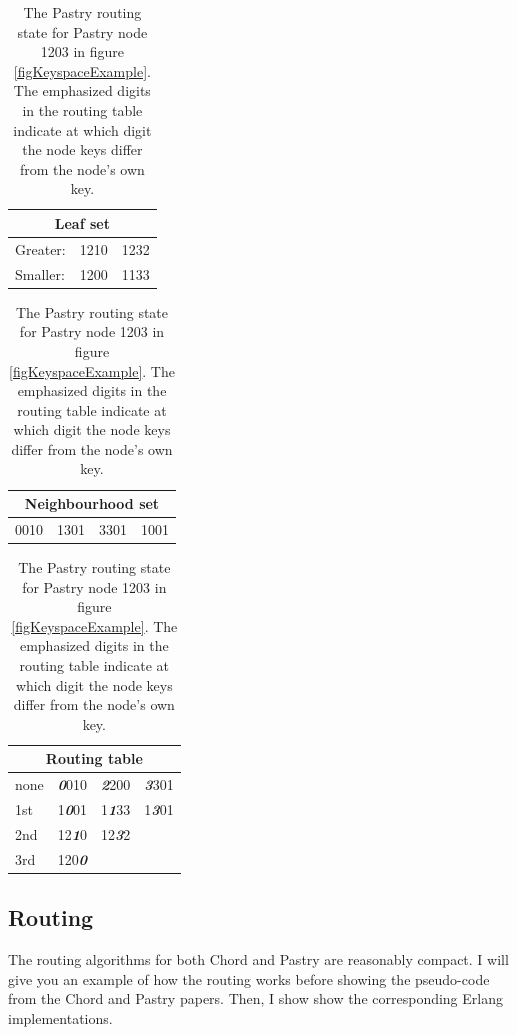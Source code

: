 \begin{table}[!htb]
\caption{The Pastry routing state for Pastry node 1203 in figure \ref{figKeyspaceExample}. The emphasized digits in the routing table indicate at which digit the node keys differ from the node's own key.}
\begin{center}
\begin{tabular}{ | l | l | l | }
  \hline
  \multicolumn{3}{|c|}{Leaf set} \\ 
  \hline
  \hline                       
  Greater: & 1210 & 1232 \\
  \hline                       
  Smaller: & 1200 & 1133 \\
  \hline                       
\end{tabular}
\begin{tabular}{ | l | l | l | l | }
  \hline                       
  \multicolumn{4}{|c|}{Neighbourhood set} \\ 
  \hline
  \hline                       
  0010 & 1301 & 3301 & 1001 \\
  \hline                       
\end{tabular}
\begin{tabular}{ | l | l | l | l | }
  \hline                       
  \multicolumn{4}{|c|}{Routing table} \\ 
  \hline
  \hline                       
  \cellcolor{green} none & \emph{\textbf{0}}010 & \emph{\textbf{2}}200 & \emph{\textbf{3}}301 \\
  \hline                       
  \cellcolor{green} 1st & 1\emph{\textbf{0}}01 & 1\emph{\textbf{1}}33 & 1\emph{\textbf{3}}01 \\
  \hline                       
  \cellcolor{green} 2nd & 12\emph{\textbf{1}}0 & 12\emph{\textbf{3}}2 & \\
  \hline                       
  \cellcolor{green} 3rd & 120\emph{\textbf{0}} & & \\
  \hline                       
\end{tabular}
\end{center}
\label{tablePastryRoutingTableImpl}
\end{table}

\subsection{Routing}
The routing algorithms for both Chord and Pastry are reasonably compact. I will give you an example of how the routing works before showing the pseudo-code from the Chord \cite{chord} and Pastry \cite{pastry} papers. Then, I show show the corresponding Erlang implementations.

